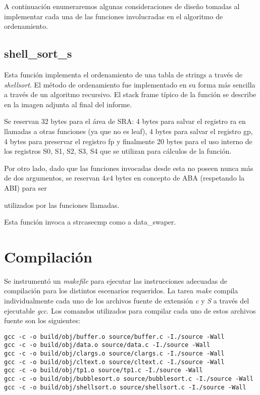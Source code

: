\documentclass[a4paper,11pt]{article}
\begin{document}
A continuación enumeraremos algunas consideraciones de diseño tomadas al
implementar cada una de las funciones involucradas en el algoritmo de
ordenamiento.

\subsection{shell\_sort\_s}

Esta función implementa el ordenamiento de una tabla de strings a través de
\textit{shellsort}. El método de ordenamiento fue implementado en su forma más
sencilla a través de un algoritmo recursivo. El stack frame típico de la
función se describe en la imagen adjunta al final del informe.

\FloatBarrier

Se reservan 32 bytes para el área de SRA: 4 bytes para salvar el registro ra en llamadas a otras funciones (ya que no es leaf), 4 bytes para salvar el registro gp, 4 bytes para preservar el registro fp y finalmente 20 bytes para el uso interno de los registros S0, S1, S2, S3, S4 que se utilizan para cálculos de la función.

Por otro lado, dado que las funciones invocadas desde esta no poseen nunca más
de dos argumentos, se reservan \(4 x 4\) bytes en concepto de ABA (respetando la ABI) para ser

utilizados por las funciones llamadas.

Esta función invoca a strcasecmp como a data\_swaper.

\FloatBarrier

\section{Compilación}

Se instrumentó un \textit{makefile} para ejecutar las instrucciones adecuadas
de compilación para los distintos escenarios requeridos. La
tarea \textit{make} compila individualmente cada uno de los archivos fuente de
extensión \textit{c} y \textit{S} a través del ejecutable \textit{gcc}.
Los comandos utilizados para compilar cada uno de estos archivos fuente son los
siguientes:

\begin{lstlisting}
gcc -c -o build/obj/buffer.o source/buffer.c -I./source -Wall 
gcc -c -o build/obj/data.o source/data.c -I./source -Wall 
gcc -c -o build/obj/clargs.o source/clargs.c -I./source -Wall 
gcc -c -o build/obj/cltext.o source/cltext.c -I./source -Wall 
gcc -c -o build/obj/tp1.o source/tp1.c -I./source -Wall 
gcc -c -o build/obj/bubblesort.o source/bubblesort.c -I./source -Wall 
gcc -c -o build/obj/shellsort.o source/shellsort.c -I./source -Wall 
\end{lstlisting}
\end{document}
